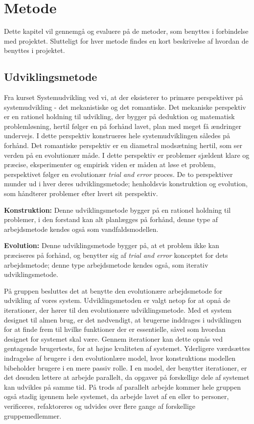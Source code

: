 \chapter{Metode}\label{chapter:Metode}

Dette kapitel vil gennemgå og evaluere på de metoder, som benyttes i forbindelse med projektet.
Slutteligt for hver metode findes en kort beskrivelse af hvordan de benyttes i projektet.

\section{Udviklingsmetode}\label{s:udviklingsmetode}
Fra kurset Systemudvikling ved vi, at der eksisterer to primære perspektiver på systemudvikling - det mekanistiske og det romantiske.
Det mekaniske perspektiv er en rationel holdning til udvikling, der bygger på deduktion og matematisk problemløsning, hertil følger en på forhånd lavet, plan med meget få ændringer undervejs.
I dette perspektiv konstrueres hele systemudviklingen således på forhånd.
Det romantiske perspektiv er en diametral modsætning hertil, som ser verden på en evolutionær måde.
I dette perspektiv er problemer sjældent klare og præcise, eksperimenter og empirisk viden er måden at løse et problem, perspektivet følger en evolutionær \textit{trial and error} proces.
De to perspektiver munder ud i hver deres udviklingsmetode; henholdsvis konstruktion og evolution, som håndterer problemer efter hvert sit perspektiv.\citep{CIC}

\textbf{Konstruktion:}
Denne udviklingsmetode bygger på en rationel holdning til problemer, i den forstand kan alt planlægges på forhånd, denne type af arbejdsmetode kendes også som vandfaldsmodellen.

\textbf{Evolution:}
Denne udviklingsmetode bygger på, at et problem ikke kan præciseres på forhånd, og benytter sig af \textit{trial and error} konceptet for dets arbejdsmetode; denne type arbejdsmetode kendes også, som iterativ udviklingsmetode.

På gruppen besluttes det at benytte den evolutionære arbejdsmetode for udvikling af vores system. 
Udviklingsmetoden er valgt netop for at opnå de iterationer, der hører til den evolutionære udviklingsmetode. 
Med et system designet til almen brug, er det nødvendigt, at brugerne inddrages i udviklingen for at finde frem til hvilke funktioner der er essentielle, såvel som hvordan designet for systemet skal være. 
Gennem iterationer kan dette opnås ved gentagende brugertests, for at højne kvaliteten af systemet. 
Yderligere værdsættes indragelse af brugere i den evolutionlære model, hvor konstruktions modellen bibeholder brugere i en mere passiv rolle.
I en model, der benytter iterationer, er det desuden lettere at arbejde parallelt, da opgaver på forskellige dele af systemet kan udvikles på samme tid.
På trods af parallelt arbejde kommer hele gruppen også stadig igennem hele systemet, da arbejde lavet af en eller to personer, verificeres, refaktoreres og udvides over flere gange af forskellige gruppemedlemmer.

